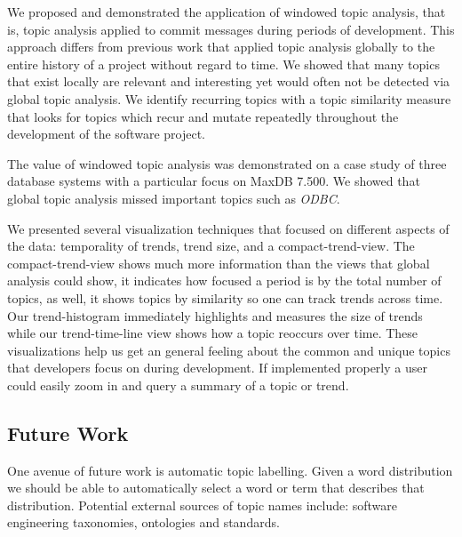 \documentclass[times, 10pt,twocolumn]{article}
\newcommand{\shrinkit}{\vspace*{-.3em}}
\begin{document}


We proposed and demonstrated the application of windowed topic
analysis, that is, topic analysis applied to commit messages during
periods of development. This approach differs from previous work that
applied topic analysis globally to the entire history of a
project without regard to time. We showed that many topics that exist
locally are relevant and interesting yet would often not be detected
via global topic analysis. We identify recurring topics with a topic
similarity measure that looks for topics which recur and mutate
repeatedly throughout the development of the software project.

The value of windowed topic analysis was demonstrated on a case study
of three database systems with a particular focus on MaxDB 7.500. We
showed that global topic analysis missed important topics such as
\emph{ODBC}.


We presented several visualization techniques that focused on
different aspects of the data: temporality of trends, trend size, and
a compact-trend-view. The compact-trend-view shows much more
information than the views that global analysis could show, it
indicates how focused a period is by the total number of topics, as
well, it shows topics by similarity so one can track trends across
time.  Our trend-histogram immediately highlights and measures the
size of trends while our trend-time-line view shows how a topic
reoccurs over time. These visualizations help us get an general
feeling about the common and unique topics that developers focus
on during development. If implemented properly a user could easily zoom in and query a
summary of a topic or trend.


\shrinkit
\subsection{ Future Work}
\shrinkit

One avenue of future work is automatic topic labelling. Given a word
distribution we should be able to automatically select a word or term
that describes that distribution. Potential external sources of topic
names include: software engineering taxonomies, ontologies and
standards.


\shrinkit



%


\end{document}

